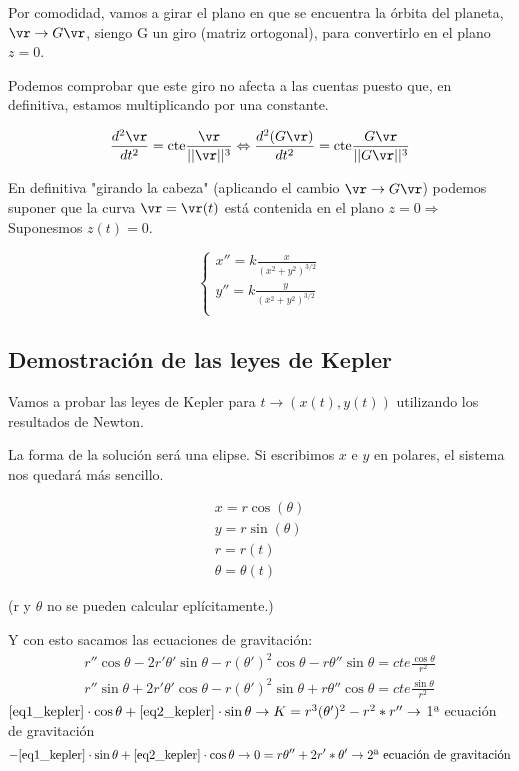 Por comodidad, vamos a girar el plano en que se encuentra la órbita del planeta, $\vr \rightarrow G\vr$, siengo G un giro (matriz ortogonal), para convertirlo en el plano $z=0$.

Podemos comprobar que este giro no afecta a las cuentas puesto que, en definitiva, estamos multiplicando por una constante.

$$\frac{d^2\vr}{dt^2} = \text{cte}\frac{\vr}{||\vr||^3} \Leftrightarrow \frac{d^2(G\vr)}{dt^2} = \text{cte}\frac{G\vr}{||G\vr||^3}$$

En definitiva "girando la cabeza" (aplicando el cambio $\vr \rightarrow G\vr$) podemos suponer que la curva $\vr = \vr(t)$ está contenida en el plano $z = 0 \Rightarrow$ Suponesmos $z(t) = 0$.


$$
\begin{cases}
 x'' = k\frac{x}{(x^2 + y^2)^{3/2}}\\
 y'' = k\frac{y}{(x^2 + y^2)^{3/2}}\\
\end{cases}
$$

\subsection{Demostración de las leyes de Kepler}

Vamos a probar las leyes de Kepler para $t \rightarrow (x(t), y(t))$ utilizando los resultados de Newton.

La forma de la solución será una elipse.
Si escribimos $x$ e $y$ en polares, el sistema nos quedará más sencillo.

$$\begin{array}{c}
x = r\cos(\theta)\\
y = r\sin(\theta) \\
r = r(t) \\
\theta = \theta(t)
\end{array}
$$

(r y $\theta$ no se pueden calcular eplícitamente.)

Y con esto sacamos las ecuaciones de gravitación:
\begin{gather}
r''\cos\theta - 2r'\theta'\sin\theta - r(\theta')^2\cos\theta - r\theta''\sin\theta = cte \frac{\cos\theta}{r^2} \label{eq1_kepler}\\
r''\sin\theta + 2r'\theta'\cos\theta - r(\theta')^2\sin\theta + r\theta''\cos\theta = cte \frac{\sin\theta}{r^2} \label{eq2_kepler}
\end{gather}
$\eqref{eq1_kepler}\cdot\cos\theta + \eqref{eq2_kepler}\cdot\sin\theta \rightarrow K= r^3(\theta')^2 - r^2*r'' \rightarrow$ 1ª ecuación de gravitación
$$-\eqref{eq1_kepler}\cdot\sin\theta + \eqref{eq2_kepler}\cdot\cos\theta \rightarrow 0= r \theta'' + 2r' * \theta' \rightarrow \text{2ª ecuación de gravitación}$$



